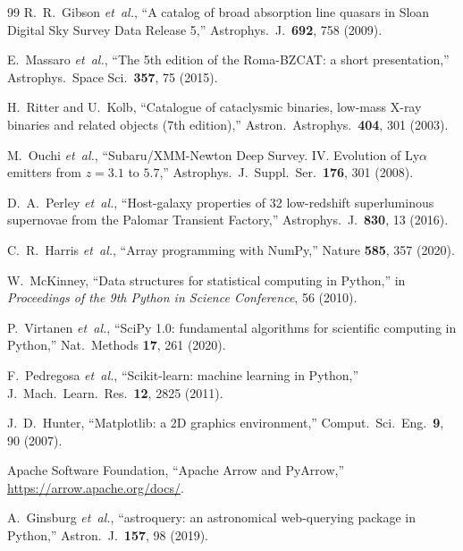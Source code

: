 \documentclass[aps,prd,twocolumn,superscriptaddress,nofootinbib,longbibliography,floatfix]{revtex4-2}
\newcommand{\etal}{\textit{et~al.}}
\begin{document}
\begin{thebibliography}{99}
 R.~R.~Gibson \etal,
  ``A catalog of broad absorption line quasars in Sloan Digital Sky Survey
  Data Release 5,'' Astrophys.\ J.\ \textbf{692}, 758 (2009).

 E.~Massaro \etal,
  ``The 5th edition of the Roma-BZCAT: a short presentation,''
  Astrophys.\ Space Sci.\ \textbf{357}, 75 (2015).

 H.~Ritter and U.~Kolb,
  ``Catalogue of cataclysmic binaries, low-mass X-ray binaries and related
  objects (7th edition),''
  Astron.\ Astrophys.\ \textbf{404}, 301 (2003).

 M.~Ouchi \etal,
  ``Subaru/XMM-Newton Deep Survey. IV. Evolution of Ly$\alpha$ emitters from
  $z=3.1$ to $5.7$,'' Astrophys.\ J.\ Suppl.\ Ser.\ \textbf{176}, 301 (2008).

 D.~A.~Perley \etal,
  ``Host-galaxy properties of 32 low-redshift superluminous supernovae from
  the Palomar Transient Factory,''
  Astrophys.\ J.\ \textbf{830}, 13 (2016).

 C.~R.~Harris \etal,
  ``Array programming with NumPy,'' Nature \textbf{585}, 357 (2020).

 W.~McKinney,
  ``Data structures for statistical computing in Python,'' in
  \textit{Proceedings of the 9th Python in Science Conference}, 56 (2010).

 P.~Virtanen \etal,
  ``SciPy 1.0: fundamental algorithms for scientific computing in Python,''
  Nat.\ Methods \textbf{17}, 261 (2020).

 F.~Pedregosa \etal,
  ``Scikit-learn: machine learning in Python,''
  J.\ Mach.\ Learn.\ Res.\ \textbf{12}, 2825 (2011).

 J.~D.~Hunter,
  ``Matplotlib: a 2D graphics environment,''
  Comput.\ Sci.\ Eng.\ \textbf{9}, 90 (2007).

 Apache Software Foundation,
  ``Apache Arrow and PyArrow,'' \url{https://arrow.apache.org/docs/}.

 A.~Ginsburg \etal,
  ``astroquery: an astronomical web-querying package in Python,''
  Astron.\ J.\ \textbf{157}, 98 (2019).

\end{thebibliography}
\end{document}
